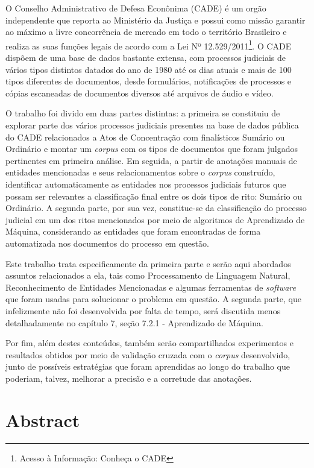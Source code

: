 \documentclass[11pt]{report}
\begin{document}
\indent\indent O Conselho Administrativo de Defesa Econônima (CADE) é um orgão independente que reporta ao Ministério da Justiça e possui como missão garantir ao máximo a livre
concorrência de mercado em todo o território Brasileiro e realiza as suas funções legais de acordo com a Lei Nº 12.529/2011\footnote[1]{Acesso à Informação: Conheça o CADE}.
O CADE dispõem de uma base de dados bastante extensa, com processos judiciais de vários tipos distintos datados do ano de 1980 até os dias atuais e mais de 100 tipos diferentes de
documentos, desde formulários, notificações de processos e cópias escaneadas de documentos diversos até arquivos de áudio e vídeo.

O trabalho foi divido em duas partes distintas: a primeira se constituiu de explorar parte dos vários processos judiciais presentes na base de dados pública do CADE relacionados a Atos de
Concentração com finalísticos Sumário ou Ordinário e montar um \textit{corpus} com os tipos de documentos que foram julgados pertinentes em primeira análise. Em seguida, a partir de anotações
manuais de entidades mencionadas e seus relacionamentos sobre o \textit{corpus} construído, identificar automaticamente as entidades nos processos judiciais futuros que possam ser relevantes a classificação
final entre os dois tipos de rito: Sumário ou Ordinário. A segunda parte, por sua vez, constitue-se da classificação do processo judicial em um dos ritos mencionados por meio de
algoritmos de Aprendizado de Máquina, considerando as entidades que foram encontradas de forma automatizada nos documentos do processo em questão.

Este trabalho trata especificamente da primeira parte e serão aqui abordados assuntos relacionados a ela, tais como Processamento de Linguagem Natural, Reconhecimento de Entidades
Mencionadas e algumas ferramentas de \textit{software} que foram usadas para solucionar o problema em questão. A segunda parte, que infelizmente não foi desenvolvida por falta de tempo,
será discutida menos detalhadamente no capítulo 7, seção 7.2.1 - Aprendizado de Máquina.

Por fim, além destes conteúdos, também serão compartilhados experimentos e resultados obtidos por meio de validação cruzada com o \textit{corpus} desenvolvido, junto de possíveis estratégias que
foram aprendidas ao longo do trabalho que poderiam, talvez, melhorar a precisão e a corretude das anotações.

\pagebreak
\thispagestyle{empty}
\chapter*{Abstract}
\end{document}
